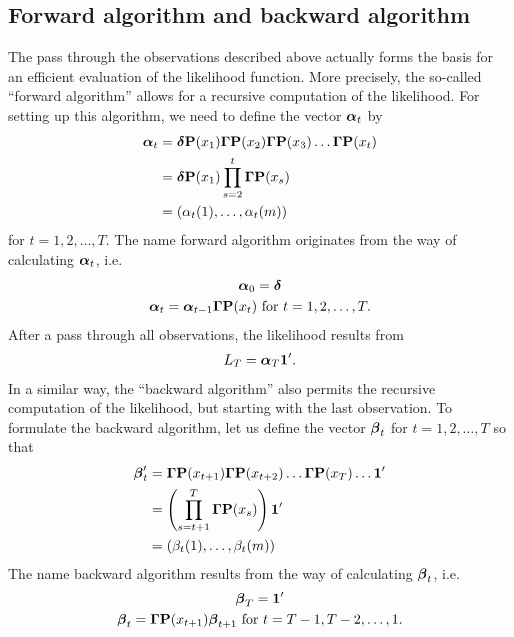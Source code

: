 \documentclass[bimj,fleqn]{w-art}\usepackage[]{graphicx}\usepackage[]{color}
\newcommand{\bcp}{{\bf P}}
\newcommand{\bgamma}{\mbox{\boldmath $\Gamma$}}
\newcommand{\balpha}{\mbox{\boldmath $\alpha$}}
\newcommand{\bfbeta}{\mbox{\boldmath $\beta$}}
\newcommand{\bfdelta}{\mbox{\boldmath $\delta$}}
\newcommand{\bone}{{\bf 1}}
\theoremstyle{plain}
\theoremstyle{definition}
\begin{document}
\subsection{Forward algorithm and backward algorithm}
\label{sec:hmm_fwbw}

The pass through the observations described above actually forms the basis for an efficient evaluation of the  likelihood function. More precisely, the so-called ``forward algorithm'' allows for a recursive computation of the likelihood. For setting up this algorithm, we need to define the vector $\balpha_t$ by
\begin{align*}
\balpha_t &= \bfdelta \bcp(x_1)\bgamma \bcp(x_2) \bgamma \bcp(x_3) \ldots \bgamma \bcp(x_t)\\
&= \bfdelta \bcp(x_1) \prod_{s=2}^{t}\bgamma \bcp(x_s)\\
&= \left( \alpha_t(1), \ldots, \alpha_t(m) \right)
\end{align*}
for $t = 1, 2, \ldots, T$. 
 The name forward algorithm originates from the way of calculating $\balpha_t$, i.e.
\begin{gather*}
\balpha_0 = \bfdelta\\
\balpha_t = \balpha_{t-1} \bgamma \bcp(x_t) \text{ for } t = 1, 2, \ldots, T.
\end{gather*}
After a pass through all observations, the likelihood results from
\begin{gather*}
L_T = \balpha_T \bone'.
\end{gather*}
In a similar way, the ``backward algorithm'' also permits the recursive computation of the likelihood, but starting with the last observation. To formulate the backward algorithm, let us define the vector $\bfbeta_t$ for $t = 1, 2,
\ldots, T$ so that
\begin{align*}
\bfbeta'_t &= \bgamma \bcp(x_{t+1}) \bgamma \bcp(x_{t+2}) \ldots \bgamma \bcp(x_T) \ldots \bone'\\
&= \left(\prod_{s=t+1}^{T}\bgamma \bcp(x_s) \right) \bone'\\
&= \left( \beta_t(1), \ldots, \beta_t(m) \right)
\end{align*}
The name backward algorithm results from the way of calculating $\bfbeta_t$, i.e.
\begin{gather*}
\bfbeta_T = \bone'\\
\bfbeta_t = \bgamma \bcp(x_{t+1}) \bfbeta_{t+1} \text{ for } t = T-1, T-2, \ldots, 1.
\end{gather*}
\end{document}
